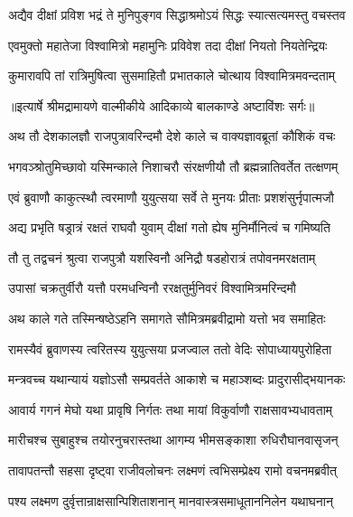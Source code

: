 \twolineshloka
{अद्यैव दीक्षां प्रविश भद्रं ते मुनिपुङ्गव}
{सिद्धाश्रमोऽयं सिद्धः स्यात्सत्यमस्तु वचस्तव} %

\twolineshloka
{एवमुक्तो महातेजा विश्वामित्रो महामुनिः}
{प्रविवेश तदा दीक्षां नियतो नियतेन्द्रियः} %

\twolineshloka
{कुमारावपि तां रात्रिमुषित्वा सुसमाहितौ}
{प्रभातकाले चोत्थाय विश्वामित्रमवन्दताम्} %


{॥इत्यार्षे श्रीमद्रामायणे वाल्मीकीये आदिकाव्ये बालकाण्डे अष्टाविंशः सर्गः॥}


\twolineshloka
{अथ तौ देशकालज्ञौ राजपुत्रावरिन्दमौ}
{देशे काले च वाक्यज्ञावब्रूतां कौशिकं वचः} %

\twolineshloka
{भगवञ्श्रोतुमिच्छावो यस्मिन्काले निशाचरौ}
{संरक्षणीयौ तौ ब्रह्मन्नातिवर्तेत तत्क्षणम्} %

\twolineshloka
{एवं ब्रुवाणौ काकुत्स्थौ त्वरमाणौ युयुत्सया}
{सर्वे ते मुनयः प्रीताः प्रशशंसुर्नृपात्मजौ} %

\twolineshloka
{अद्य प्रभृति षड्रात्रं रक्षतं राघवौ युवाम्}
{दीक्षां गतो ह्येष मुनिर्मौनित्वं च गमिष्यति} %

\twolineshloka
{तौ तु तद्वचनं श्रुत्वा राजपुत्रौ यशस्विनौ}
{अनिद्रौ षडहोरात्रं तपोवनमरक्षताम्} %

\twolineshloka
{उपासां चक्रतुर्वीरौ यत्तौ परमधन्विनौ}
{ररक्षतुर्मुनिवरं विश्वामित्रमरिन्दमौ} %

\twolineshloka
{अथ काले गते तस्मिन्षष्ठेऽहनि समागते}
{सौमित्रमब्रवीद्रामो यत्तो भव समाहितः} %

\twolineshloka
{रामस्यैवं ब्रुवाणस्य त्वरितस्य युयुत्सया}
{प्रजज्वाल ततो वेदिः सोपाध्यायपुरोहिता} %

\twolineshloka
{मन्त्रवच्च यथान्यायं यज्ञोऽसौ सम्प्रवर्तते}
{आकाशे च महाञ्शब्दः प्रादुरासीद्भयानकः} %

\twolineshloka
{आवार्य गगनं मेघो यथा प्रावृषि निर्गतः}
{तथा मायां विकुर्वाणौ राक्षसावभ्यधावताम्} %

\twolineshloka
{मारीचश्च सुबाहुश्च तयोरनुचरास्तथा}
{आगम्य भीमसङ्काशा रुधिरौघानवासृजन्} %

\twolineshloka
{तावापतन्तौ सहसा दृष्ट्वा राजीवलोचनः}
{लक्ष्मणं त्वभिसम्प्रेक्ष्य रामो वचनमब्रवीत्} %

\twolineshloka
{पश्य लक्ष्मण दुर्वृत्तान्राक्षसान्पिशिताशनान्}
{मानवास्त्रसमाधूताननिलेन यथाघनान्} %

